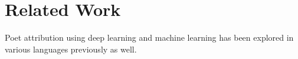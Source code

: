 \section{Related Work}

Poet attribution using deep learning and machine learning has been explored in various languages previously as well. 


